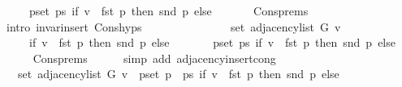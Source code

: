 \begin{isabellebody}
\ \ \ \ \ {\isacharparenleft}{\kern0pt}{\isasymUnion}p{\isasymin}set\ ps{\isachardot}{\kern0pt}\ if\ v\ {\isacharequal}{\kern0pt}\ fst\ p\ then\ {\isacharbraceleft}{\kern0pt}snd\ p{\isacharbraceright}{\kern0pt}\ else\ {\isacharbraceleft}{\kern0pt}{\isacharbraceright}{\kern0pt}{\isacharparenright}{\kern0pt}{\isachardoublequoteclose}\isanewline
\ \ \ \ \isamarkupfalse%
\ Cons{\isachardot}{\kern0pt}prems\isanewline
\ \ \ \ \isamarkupfalse%
\ {\isacharparenleft}{\kern0pt}intro\ invar{\isacharunderscore}{\kern0pt}insert\ Cons{\isachardot}{\kern0pt}hyps{\isacharparenright}{\kern0pt}\isanewline
\ \ \isamarkupfalse%
\ \isamarkupfalse%
\isanewline
\ \ \ \ {\isachardoublequoteopen}{\isachardot}{\kern0pt}{\isachardot}{\kern0pt}{\isachardot}{\kern0pt}\ {\isacharequal}{\kern0pt}\isanewline
\ \ \ \ \ set\ {\isacharparenleft}{\kern0pt}adjacency{\isacharunderscore}{\kern0pt}list\ G\ v{\isacharparenright}{\kern0pt}\ {\isasymunion}\isanewline
\ \ \ \ \ {\isacharparenleft}{\kern0pt}if\ v\ {\isacharequal}{\kern0pt}\ fst\ p\ then\ {\isacharbraceleft}{\kern0pt}snd\ p{\isacharbraceright}{\kern0pt}\ else\ {\isacharbraceleft}{\kern0pt}{\isacharbraceright}{\kern0pt}{\isacharparenright}{\kern0pt}\ {\isasymunion}\isanewline
\ \ \ \ \ {\isacharparenleft}{\kern0pt}{\isasymUnion}p{\isasymin}set\ ps{\isachardot}{\kern0pt}\ if\ v\ {\isacharequal}{\kern0pt}\ fst\ p\ then\ {\isacharbraceleft}{\kern0pt}snd\ p{\isacharbraceright}{\kern0pt}\ else\ {\isacharbraceleft}{\kern0pt}{\isacharbraceright}{\kern0pt}{\isacharparenright}{\kern0pt}{\isachardoublequoteclose}\isanewline
\ \ \ \ \isamarkupfalse%
\ Cons{\isachardot}{\kern0pt}prems\isanewline
\ \ \ \ \isamarkupfalse%
\ {\isacharparenleft}{\kern0pt}simp\ add{\isacharcolon}{\kern0pt}\ adjacency{\isacharunderscore}{\kern0pt}insert{\isacharunderscore}{\kern0pt}cong{\isacharparenright}{\kern0pt}\isanewline
\ \ \isamarkupfalse%
\ \isamarkupfalse%
\ {\isachardoublequoteopen}{\isachardot}{\kern0pt}{\isachardot}{\kern0pt}{\isachardot}{\kern0pt}\ {\isacharequal}{\kern0pt}\ set\ {\isacharparenleft}{\kern0pt}adjacency{\isacharunderscore}{\kern0pt}list\ G\ v{\isacharparenright}{\kern0pt}\ {\isasymunion}\ {\isacharparenleft}{\kern0pt}{\isasymUnion}p{\isasymin}set\ {\isacharparenleft}{\kern0pt}p\ {\isacharhash}{\kern0pt}\ ps{\isacharparenright}{\kern0pt}{\isachardot}{\kern0pt}\ if\ v\ {\isacharequal}{\kern0pt}\ fst\ p\ then\ {\isacharbraceleft}{\kern0pt}snd\ p{\isacharbraceright}{\kern0pt}\ else\ {\isacharbraceleft}{\kern0pt}{\isacharbraceright}{\kern0pt}{\isacharparenright}{\kern0pt}{\isachardoublequoteclose}\isanewline

\end{isabellebody}
